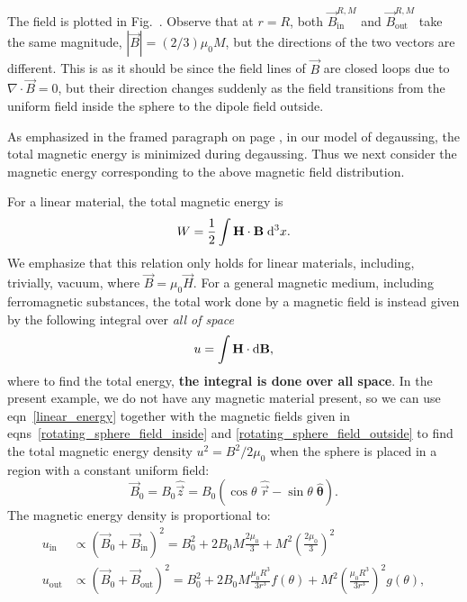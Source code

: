 The field is plotted in Fig.~. Observe that at $r=R$, both
$\vec B_\text{in}^{R,M}$ and $\vec B_\text{out}^{R,M}$ take the same magnitude,
$|\vec B|=(2/3)\mu_0M$, but the directions of the two vectors are different.
This is as it should be since the field lines of $\vec B$ are closed loops due
to $\nabla\cdot\vec B=0$, but their direction changes suddenly as the field
transitions from the uniform field inside the sphere to the dipole field
outside.

As emphasized in the framed paragraph on page \pageref{framed_principle}, in our
model of degaussing, the total magnetic energy is minimized during degaussing.
Thus we next consider the magnetic energy corresponding to the above magnetic
field distribution.

For a linear material, the total magnetic energy is
\cite[eqn~5.148]{jackson1998classical}
%
\begin{align}
   \label{linear_energy}
   W=\frac{1}{2}\int\mathbf{H}\cdot\mathbf{B}\;\mathrm{d}^3x.
\end{align}
%
We emphasize that this relation only holds for linear materials, including,
trivially, vacuum, where $\vec B=\mu_0\vec H$. For a general magnetic medium,
including ferromagnetic substances, the total work done by a magnetic field is
instead given by the following integral over \emph{all of space}
\cite[eqn~5.147]{jackson1998classical}
%
\begin{align}
   \label{general_energy}
   u=\int\mathbf{H}\cdot\mathbf{\mathrm{d}}\mathbf{B},
\end{align}
%
where to find the total energy, \textbf{the integral is done over all space}. In
the present example, we do not have any magnetic material present, so we can use
eqn~\ref{linear_energy} together with the magnetic fields given in
eqns~\ref{rotating_sphere_field_inside} and \ref{rotating_sphere_field_outside}
to find the total magnetic energy density $u^2=B^2/2\mu_0$ when the sphere is
placed in a region with a constant uniform field:
%
\[
   \vec B_0=B_0\hat{\vec z}=B_0(\cos\theta\;\hat{\vec
   r}-\sin\theta\;\hat{\boldsymbol\theta}).
\]
%
The magnetic energy density is proportional to:
%
\begin{align}
   u_\text{in}&\propto(\vec B_0+\vec B_\text{in})^2
   =B_0^2+2B_0M\frac{2\mu_0}{3}+M^2\left(\frac{2\mu_0}{3}\right)^2\nonumber\\
   u_\text{out}&\propto(\vec B_0+\vec B_\text{out})^2
   =B_0^2+2B_0M\frac{\mu_0R^3}{3r^3}f(\theta)+M^2\left(\frac{\mu_0R^3}{3r^3}\right)^2g(\theta),\nonumber
\end{align}
